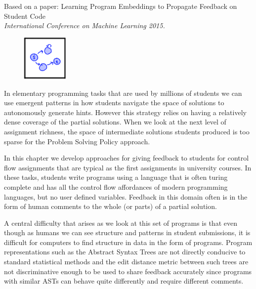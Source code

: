 Based on a paper: Learning Program Embeddings to Propagate Feedback on Student Code \cite{piechICML15} \\ \emph{International Conference on Machine Learning 2015.}

\vspace{7mm}

\begin{figure}[h!]
\includegraphics[width=0.2\textwidth]{img/assnType_3}
\end{figure}

\vspace{7mm}

In elementary programming tasks that are used by millions of students we can use emergent patterns in how students navigate the space of solutions to autonomously generate hints. However this strategy relies on having a relatively dense coverage of the partial solutions. When we look at the next level of assignment richness, the space of intermediate solutions students produced is too sparse for the Problem Solving Policy approach. 

In this chapter we develop approaches for giving feedback to students for control flow assignments that are typical as the first assignments in university courses. In these tasks, students write programs using a language that is often turing complete and has all the control flow affordances of modern programming languages, but no user defined variables. Feedback in this domain often is in the form of human comments to the whole (or parts) of a partial solution. 

A central difficulty that arises as we look at this set of programs is that even though as humans we can see structure and patterns in student submissions, it is difficult for computers to find structure in data in the form of programs.  Program representations
such as the Abstract Syntax Trees are not directly conducive to standard statistical methods and the edit distance metric between such trees 
are not discriminative enough to be used to share feedback accurately since programs with similar ASTs can behave quite differently and require different comments. 

